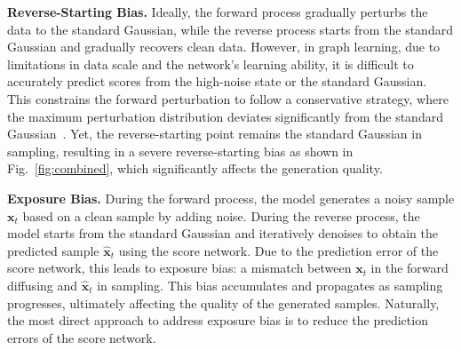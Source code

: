 \documentclass{article}
\newcommand{\x}{{{\bm x}}}
\begin{document}
\textbf{Reverse-Starting Bias.} Ideally, the forward process gradually perturbs the data to the standard Gaussian, while the reverse process starts from the standard Gaussian and gradually recovers clean data. However, in graph learning, due to limitations in data scale and the network's learning ability, it is difficult to accurately predict scores from the high-noise state or the standard Gaussian. This constrains the forward perturbation to follow a conservative strategy, where the maximum perturbation distribution deviates significantly from the standard Gaussian~\citep{jo2022GDSS, luo2023fast, wen2024hyperbolic}. Yet, the reverse-starting point remains the standard Gaussian in sampling, resulting in a severe reverse-starting bias as shown in Fig.~\ref{fig:combined}, which significantly affects the generation quality.

\textbf{Exposure Bias.} During the forward process, the model generates a noisy sample $\x_t$ based on a clean sample by adding noise. During the reverse process, the model starts from the standard Gaussian and iteratively denoises to obtain the predicted sample $\hat{\x}_t$ using the score network. Due to the prediction error of the score network, this leads to exposure bias: a mismatch between $\x_t$ in the forward diffusing and $\hat{\x}_t$ in sampling. This bias accumulates and propagates as sampling progresses, ultimately affecting the quality of the generated samples. Naturally, the most direct approach to address exposure bias is to reduce the prediction errors of the score network.
\end{document}
